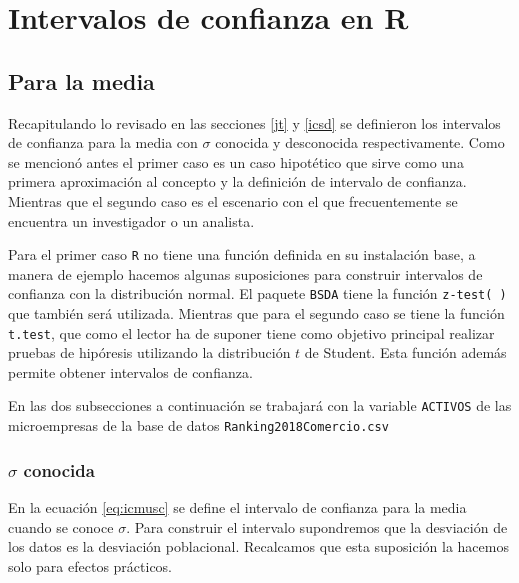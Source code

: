 \documentclass[letterpaper,]{book}
\begin{document}
\newpage

\hypertarget{intervalos-de-confianza-en-r}{%
\section{Intervalos de confianza en R}\label{intervalos-de-confianza-en-r}}

\hypertarget{para-la-media}{%
\subsection{Para la media}\label{para-la-media}}

Recapitulando lo revisado en las secciones \ref{jt} y \ref{icsd} se definieron los intervalos de confianza para la media con \(\sigma\) conocida y desconocida respectivamente. Como se mencionó antes el primer caso es un caso hipotético que sirve como una primera aproximación al concepto y la definición de intervalo de confianza. Mientras que el segundo caso es el escenario con el que frecuentemente se encuentra un investigador o un analista.

Para el primer caso \texttt{R} no tiene una función definida en su instalación base, a manera de ejemplo hacemos algunas suposiciones para construir intervalos de confianza con la distribución normal. El paquete \texttt{BSDA} tiene la función \texttt{z-test(\ )} que también será utilizada. Mientras que para el segundo caso se tiene la función \texttt{t.test}, que como el lector ha de suponer tiene como objetivo principal realizar pruebas de hipóresis utilizando la distribución \(t\) de Student. Esta función además permite obtener intervalos de confianza.

En las dos subsecciones a continuación se trabajará con la variable \texttt{ACTIVOS} de las microempresas de la base de datos \texttt{Ranking2018Comercio.csv}

\hypertarget{musc}{%
\subsubsection{\texorpdfstring{\(\sigma\) conocida}{\textbackslash{}sigma conocida}}\label{musc}}

En la ecuación \eqref{eq:icmusc} se define el intervalo de confianza para la media cuando se conoce \(\sigma\). Para construir el intervalo supondremos que la desviación de los datos es la desviación poblacional. Recalcamos que esta suposición la hacemos solo para efectos prácticos.
\end{document}
